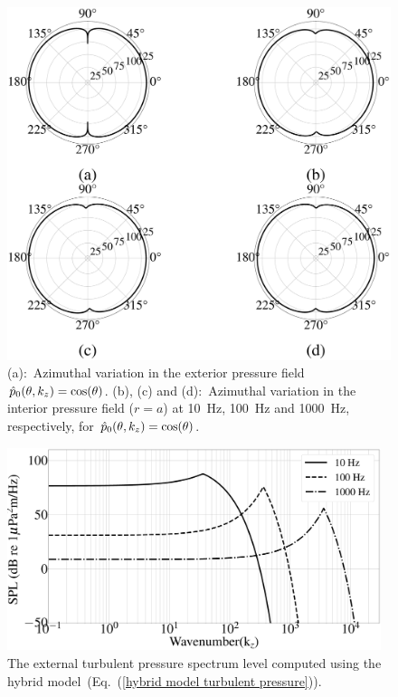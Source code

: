 \documentclass[11pt,cleanfoot]{asme2ej}
\begin{document}
\begin{figure}[ht]
    \centerline{
    \includegraphics[width=4.5in]{polarplot_cos_theta.eps}}
    \caption{(a):~Azimuthal variation in the exterior pressure field $\Hat{p}_0(\theta,k_z) =\cos(\theta)$. (b), (c) and (d):~Azimuthal variation in the interior pressure field ($r=a$) at 10~Hz, 100~Hz and 1000~Hz, respectively, for $\Hat{p}_0(\theta,k_z) =\cos(\theta)$.}
    \label{polar plot cos theta}
\end{figure}



\begin{figure}[ht]
    \centerline{
    \includegraphics[width=4.3in]{Comparison_of_turbulent_pressure_spectrum_of_Hybrid.eps}}
    \caption{The external turbulent pressure spectrum level computed using the hybrid model~(Eq.~(\ref{hybrid model turbulent pressure})).}
    \label{Hybrid turbulent pressure spectrum}
\end{figure}
\end{document}
